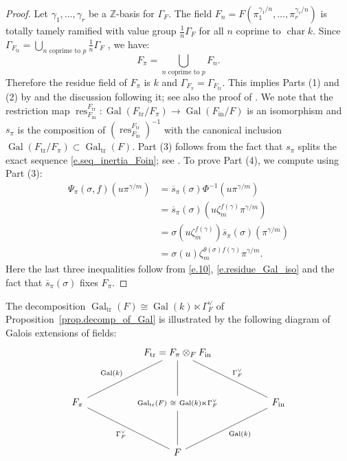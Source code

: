 \documentclass[12pt]{amsart}
\numberwithin{equation}{section}
\theoremstyle{definition}
\newcommand{\bZ}{\mathbb{Z}}
\newcommand{\Gal}{\operatorname{Gal}}
\newcommand{\Char}{\operatorname{char}}
\newcommand{\tr}{\operatorname{tr}}
\newcommand{\res}{\operatorname{res}}
\newcommand{\Ftr}{F_{\tr}}
\newcommand{\oin}{\operatorname{in}}
\newcommand{\Fin}{F_{\oin}}
\newcommand{\Galtr}{\Gal_{\tr}}
\newcommand{\I}[1]{\Gamma_{#1}^{\vee}}
\begin{document}
\begin{proof}
    Let $\gamma_1,\dots,\gamma_r$ be a $\bZ$-basis for $\Gamma_F$. The field $F_n = F(\pi_1^{\gamma_1/n},\dots,\pi_r^{\gamma_r/n})$
    is totally tamely ramified with value group $\frac{1}{n}\Gamma_F$ for all $n$ coprime to $\Char k$. Since $\Gamma_{\Ftr} = \bigcup_{n \text{ coprime to }p} \frac{1}{n} \Gamma_{F}$ \cite[Theorem A.24]{tignol2015value}, we have:
    $$F_\pi = \bigcup_{n \text{ coprime to }p} F_n.$$
    Therefore the residue field of $F_\pi$ is $k$ and $\Gamma_{F_{\pi}} = \Gamma_{\Ftr}$. 
    This implies Parts (1) and (2) by \cite[Satz 2]{neukirch1968verzweigungstheorie} and the discussion following it; see also the proof of \cite[Theorem 22.1.1]{efrat2006valuations}. We note that the restriction map $\res^{\Ftr}_{\Fin}:\Gal(\Ftr/F_\pi)\to \Gal(\Fin/F)$ is an isomorphism and $s_\pi$ is the composition of $(\res^{\Ftr}_{\Fin})^{-1}$ with the canonical inclusion $\Gal(\Ftr/F_\pi)\subset \Galtr(F)$. Part (3) follows from the fact that $s_\pi$ splits the exact sequence \eqref{e.seq_inertia_Foin}; see \cite[Corollary 22.1.2]{efrat2006valuations}. To prove Part (4), we compute using Part (3):
\begin{align*}
\Psi_\pi(\sigma,f)(u\pi^{\gamma/m}) &= \overline{s}_\pi(\sigma) \Phi^{-1}(u \pi^{\gamma/m}) \\
                    &= \overline{s}_\pi(\sigma)(u \zeta_m^{f(\gamma)} \pi^{\gamma/m}) \\
                    &=\sigma(u \zeta_m^{f(\gamma)}) \overline{s}_\pi(\sigma)(\pi^{\gamma/m})  \\
                    &= \sigma(u) \zeta_m^{\theta(\sigma)f(\gamma)} \pi^{\gamma/m}.
\end{align*}
    Here the last three inequalities follow from \eqref{e.10}, \eqref{e.residue_Gal_iso} and the fact that $\overline{s}_\pi(\sigma)$ fixes $F_\pi$.
 \end{proof}
The decomposition  $\Galtr(F)\cong \Gal(k)\ltimes \I{F}$ of Proposition~\ref{prop.decomp_of_Gal} is illustrated by the following diagram of Galois extensions of fields:
\begin{equation}
\begin{tikzcd}[row sep = huge, column sep = huge, arrow style=tikz,arrows=-]
 & \Ftr = F_{\pi} \otimes_F \Fin
   \arrow[dl, "\Gal(k)"']
   \arrow[dr, "\I{F}"] & \\
F_\pi
   \arrow[dr, "\I{F}"']
 & {\scriptstyle \Galtr(F) \  \cong\  \Gal(k)\ltimes\I{F}} \arrow[u] & \Fin \\
 & F
   \arrow[u]
   \arrow[ur, "\Gal(k)"'] &
\end{tikzcd}
\end{equation}
\end{document}
